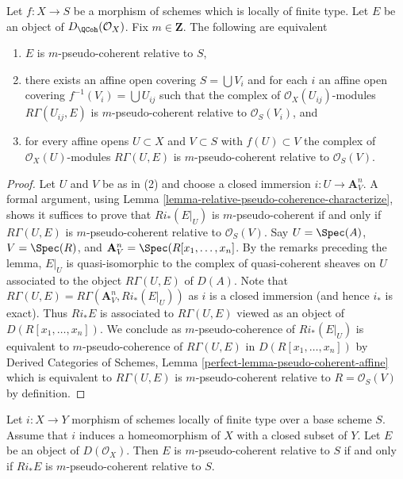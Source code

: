 \begin{lemma}
\label{lemma-qcoh-relative-pseudo-coherence-characterize}
Let $f : X \to S$ be a morphism of schemes which is locally of finite type.
Let $E$ be an object of $D_\QCoh(\mathcal{O}_X)$.
Fix $m \in \mathbf{Z}$. The following are equivalent
\begin{enumerate}
\item $E$ is $m$-pseudo-coherent relative to $S$,
\item there exists an affine open covering $S = \bigcup V_i$ and
for each $i$ an affine open covering $f^{-1}(V_i) = \bigcup U_{ij}$
such that the complex of $\mathcal{O}_X(U_{ij})$-modules
$R\Gamma(U_{ij}, E)$ is $m$-pseudo-coherent relative to
$\mathcal{O}_S(V_i)$, and
\item for every affine opens $U \subset X$ and $V \subset S$
with $f(U) \subset V$ the complex of $\mathcal{O}_X(U)$-modules
$R\Gamma(U, E)$ is $m$-pseudo-coherent relative to $\mathcal{O}_S(V)$.
\end{enumerate}
\end{lemma}

\begin{proof}
Let $U$ and $V$ be as in (2) and choose a closed immersion
$i : U \to \mathbf{A}^n_V$. A formal argument, using
Lemma \ref{lemma-relative-pseudo-coherence-characterize}, shows it
suffices to prove that
$Ri_*(E|_U)$ is $m$-pseudo-coherent if and only if $R\Gamma(U, E)$
is $m$-pseudo-coherent relative to $\mathcal{O}_S(V)$.
Say $U = \Spec(A)$, $V = \Spec(R)$, and
$\mathbf{A}^n_V = \Spec(R[x_1, \ldots, x_n]$. By the remarks
preceding the lemma, $E|_U$ is quasi-isomorphic to the
complex of quasi-coherent sheaves on $U$ associated to the object
$R\Gamma(U, E)$ of $D(A)$. Note that
$R\Gamma(U, E) = R\Gamma(\mathbf{A}^n_V, Ri_*(E|_U))$ as $i$ is a
closed immersion (and hence $i_*$ is exact). Thus $Ri_*E$
is associated to $R\Gamma(U, E)$ viewed as an object of
$D(R[x_1, \ldots, x_n])$. We conclude as $m$-pseudo-coherence
of $Ri_*(E|_U)$ is equivalent to $m$-pseudo-coherence of
$R\Gamma(U, E)$ in $D(R[x_1, \ldots, x_n])$ by
Derived Categories of Schemes, Lemma \ref{perfect-lemma-pseudo-coherent-affine}
which is equivalent to $R\Gamma(U, E)$ is $m$-pseudo-coherent
relative to $R = \mathcal{O}_S(V)$ by definition.
\end{proof}

\begin{lemma}
\label{lemma-closed-morphism-relative-pseudo-coherence}
Let $i : X \to Y$ morphism of schemes locally of finite type over a
base scheme $S$. Assume that $i$ induces a homeomorphism of $X$ with a closed
subset of $Y$. Let $E$ be an object of $D(\mathcal{O}_X)$.
Then $E$ is $m$-pseudo-coherent relative to $S$ if and only if
$Ri_*E$ is $m$-pseudo-coherent relative to $S$.
\end{lemma}

